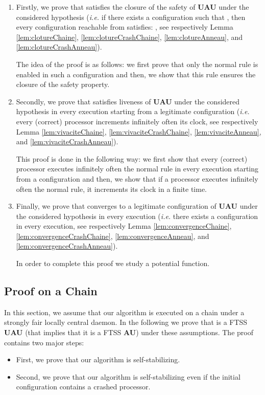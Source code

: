 \documentclass[11pt,english,letterpaper]{article}
\begin{document}
\begin{enumerate}
\item Firstly, we prove that  satisfies the closure of the safety of \textbf{UAU} under the considered hypothesis (\emph{i.e.} if there exists a configuration  such that , then every configuration  reachable from  satisfies: , see respectively Lemma \ref{lem:clotureChaine}, \ref{lem:clotureCrashChaine}, \ref{lem:clotureAnneau}, and \ref{lem:clotureCrashAnneau}).

The idea of the proof is as follows: we first prove that only the normal rule is enabled in such a configuration and then, we show that this rule ensures the closure of the safety property.
\item Secondly, we prove that  satisfies liveness of \textbf{UAU} under the considered hypothesis in every execution starting from a legitimate configuration (\emph{i.e.} every (correct) processor increments infinitely often its clock, see respectively Lemma \ref{lem:vivaciteChaine}, \ref{lem:vivaciteCrashChaine}, \ref{lem:vivaciteAnneau}, and \ref{lem:vivaciteCrashAnneau}).

This proof is done in the following way: we first show that every (correct) processor executes infinitely often the normal rule in every execution starting from a configuration  and then, we show that if a processor executes infinitely often the normal rule, it increments its clock in a finite time.
\item Finally, we prove that  converges to a legitimate configuration of \textbf{UAU} under the considered hypothesis in every execution (\emph{i.e.} there exists a configuration  in every execution, see respectively Lemma \ref{lem:convergenceChaine}, \ref{lem:convergenceCrashChaine}, \ref{lem:convergenceAnneau}, and \ref{lem:convergenceCrashAnneau}).

In order to complete this proof we study a potential function.
\end{enumerate}

\subsection{Proof on a Chain}

In this section, we assume that our algorithm is executed on a chain under a strongly fair locally central daemon. In the following we prove that  is a FTSS \textbf{UAU} (that implies that it is a FTSS \textbf{AU}) under these assumptions. The proof contains two major steps:

\begin{itemize}
\item First, we prove that our algorithm is self-stabilizing.
\item Second, we  prove that our algorithm is self-stabilizing even if the initial configuration contains a crashed processor.
\end{itemize}
\end{document}
